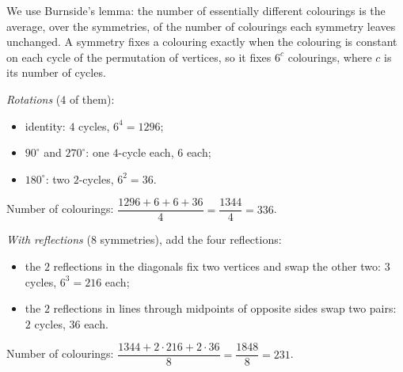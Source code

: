 We use Burnside's lemma: the number of essentially different colourings is the average, over the symmetries, of the number of colourings each symmetry leaves unchanged. A symmetry fixes a colouring exactly when the colouring is constant on each cycle of the permutation of vertices, so it fixes $6^c$ colourings, where $c$ is its number of cycles.

\emph{Rotations} ($4$ of them):
\begin{itemize}
\item identity: $4$ cycles, $6^4=1296$;
\item $90^\circ$ and $270^\circ$: one $4$-cycle each, $6$ each;
\item $180^\circ$: two $2$-cycles, $6^2=36$.
\end{itemize}
Number of colourings: $\dfrac{1296+6+6+36}{4}=\dfrac{1344}{4}=\boxed{336}$.

\emph{With reflections} ($8$ symmetries), add the four reflections:
\begin{itemize}
\item the $2$ reflections in the diagonals fix two vertices and swap the other two: $3$ cycles, $6^3=216$ each;
\item the $2$ reflections in lines through midpoints of opposite sides swap two pairs: $2$ cycles, $36$ each.
\end{itemize}
Number of colourings: $\dfrac{1344+2\cdot216+2\cdot36}{8}=\dfrac{1848}{8}=\boxed{231}$.
